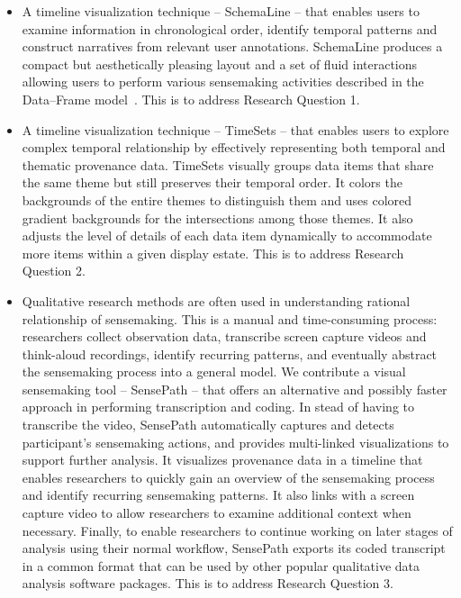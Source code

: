 \begin{itemize}
	\item A timeline visualization technique -- SchemaLine -- that enables users to examine information in chronological order, identify temporal patterns and construct narratives from relevant user annotations. SchemaLine produces a compact but aesthetically pleasing layout and a set of fluid interactions allowing users to perform various sensemaking activities described in the Data--Frame model~\cite{Klein2003}. This is to address Research Question 1.
	
	\item A timeline visualization technique -- TimeSets -- that enables users to explore complex temporal relationship by effectively representing both temporal and thematic provenance data. TimeSets visually groups data items that share the same theme but still preserves their temporal order. It colors the backgrounds of the entire themes to distinguish them and uses colored gradient backgrounds for the intersections among those themes. It also adjusts the level of details of each data item dynamically to accommodate more items within a given display estate. This is to address Research Question 2. 
	
	\item Qualitative research methods are often used in understanding rational relationship of sensemaking. This is a manual and time-consuming process: researchers collect observation data, transcribe screen capture videos and think-aloud recordings, identify recurring patterns, and eventually abstract the sensemaking process into a general model. We contribute a visual sensemaking tool -- SensePath -- that offers an alternative and possibly faster approach in performing transcription and coding. In stead of having to transcribe the video, SensePath automatically captures and detects participant's sensemaking actions, and provides multi-linked visualizations to support further analysis. It visualizes provenance data in a timeline that enables researchers to quickly gain an overview of the sensemaking process and identify recurring sensemaking patterns. It also links with a screen capture video to allow researchers to examine  additional context when necessary. Finally, to enable researchers to continue working on later stages of analysis using their normal workflow, SensePath exports its coded transcript in a common format that can be used by other popular qualitative data analysis software packages. This is to address Research Question 3.	
	

\end{itemize}
